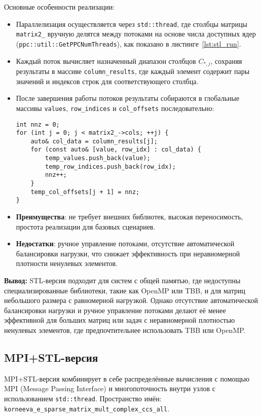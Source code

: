 \documentclass[12pt]{extarticle}
\begin{document}
Основные особенности реализации:
\begin{itemize}
    \item Параллелизация осуществляется через \texttt{std::thread}, где столбцы матрицы \texttt{matrix2\_} вручную делятся между потоками на основе числа доступных ядер (\texttt{ppc::util::GetPPCNumThreads}), как показано в листинге~\ref{lst:stl_run}.
    \item Каждый поток вычисляет назначенный диапазон столбцов $C_{*,j}$, сохраняя результаты в массиве \texttt{column\_results}, где каждый элемент содержит пары значений и индексов строк для соответствующего столбца.
    \item После завершения работы потоков результаты собираются в глобальные массивы \texttt{values}, \texttt{row\_indices} и \texttt{col\_offsets} последовательно:
    \begin{lstlisting}[caption={Объединение результатов в методе RunImpl},label={lst:stl_merge}]
int nnz = 0;
for (int j = 0; j < matrix2_->cols; ++j) {
    auto& col_data = column_results[j];
    for (const auto& [value, row_idx] : col_data) {
        temp_values.push_back(value);
        temp_row_indices.push_back(row_idx);
        nnz++;
    }
    temp_col_offsets[j + 1] = nnz;
}
    \end{lstlisting}
    \item \textbf{Преимущества}: не требует внешних библиотек, высокая переносимость, простота реализации для базовых сценариев.
    \item \textbf{Недостатки}: ручное управление потоками, отсутствие автоматической балансировки нагрузки, что снижает эффективность при неравномерной плотности ненулевых элементов.
\end{itemize}

\textbf{Вывод:} STL-версия подходит для систем с общей памятью, где недоступны специализированные библиотеки, такие как OpenMP или TBB, и для матриц небольшого размера с равномерной нагрузкой. Однако отсутствие автоматической балансировки нагрузки и ручное управление потоками делают её менее эффективной для больших матриц или задач с неравномерной плотностью ненулевых элементов, где предпочтительнее использовать TBB или OpenMP.

\subsection{MPI+STL-версия}

\hspace*{1.25cm}MPI+STL-версия комбинирует в себе распределённые вычисления с помощью MPI (Message Passing Interface) и многопоточность внутри узлов с использованием \texttt{std::thread}. Пространство имён: \texttt{korneeva\_e\_sparse\_matrix\_mult\_complex\_ccs\_all}. \\[-0.1cm]
\end{document}
